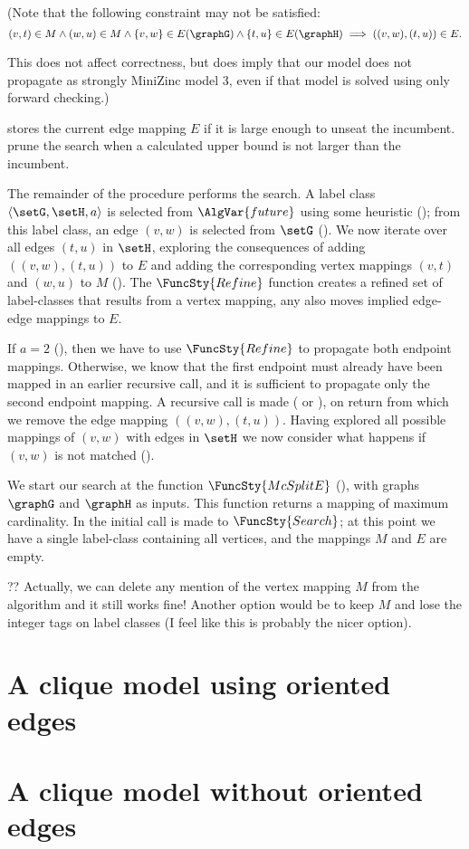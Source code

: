 (Note that the following constraint may not be satisfied:
\[
(v,t) \in M \wedge (w,u) \in M \wedge \{v,w\} \in E(\graphG) \wedge \{t,u\} \in E(\graphH) \implies ((v,w),(t,u)) \in E.
\]

This does not affect correctness, but does imply that our model does not propagate as strongly MiniZinc model 3,
even if that model is solved using only forward checking.)

 stores the current edge mapping $E$ if it is large enough
to unseat the incumbent.   prune the
search when a calculated upper bound is not larger than the incumbent.

The remainder of the procedure performs the search.  A label class $\langle
\setG, \setH, a \rangle$ is selected from $\AlgVar{future}$ using some
heuristic (); from this label class, an edge $(v,w)$ is
selected from $\setG$ (). We now iterate over all edges
$(t,u)$ in $\setH$, exploring the consequences of adding $((v,w),(t,u))$ to $E$
and adding the corresponding vertex mappings $(v,t)$ and $(w,u)$ to $M$
().  The $\FuncSty{Refine}$ function
creates a refined set of label-classes that results from a vertex mapping,
any also moves implied edge-edge mappings to $E$.

If $a=2$ (), then we have to use $\FuncSty{Refine}$ to propagate
both endpoint mappings.  Otherwise, we know that the first endpoint must already have
been mapped in an earlier recursive call, and it is sufficient to propagate only the second
endpoint mapping.  
A recursive call is made ( or ),
on return from which we remove the edge mapping $((v,w),(t,u))$.
Having explored all possible mappings of $(v,w)$ with edges in $\setH$ we now
consider what happens if $(v,w)$ is not matched
().

We start our search at the function $\FuncSty{McSplitE}$ (),
with graphs $\graphG$ and $\graphH$ as inputs.  This function returns a mapping of
maximum cardinality.  In  the initial call is made to
$\FuncSty{Search}$; at this point we have a single label-class containing all
vertices, and the mappings $M$ and $E$ are empty.

?? Actually, we can delete any mention of the vertex mapping $M$ from the algorithm and it still works fine!
Another option would be to keep $M$ and lose the integer tags on label classes (I feel like this is probably the
nicer option).

\section{A clique model using oriented edges}

\section{A clique model without oriented edges}
